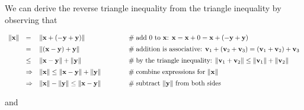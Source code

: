 \documentclass{article}
\theoremstyle{definition}
\begin{document}
\bigskip
\noindent 
We can derive the reverse triangle inequality from the
triangle inequality
\cite{vector_norms_and_matrix_norms,wiki:triangle_inequality} by
observing that

\begin{equation*}
\begin{array}{lllll}
\| \mathbf{x} \|
&=& \| \mathbf{x} + (-\mathbf{y} + \mathbf{y})\| 
					&\hspace{1.1cm} \mathrel{\#} \text{add 0 to $\mathbf{x}$: }
					\mathbf{x} =  \mathbf{x} + 0 
					= \mathbf{x} + (-\mathbf{y} + \mathbf{y}) \\
[5pt]
&=& \| (\mathbf{x} - \mathbf{y} ) + \mathbf{y} \|
					&\hspace{1.1cm} \mathrel{\#} \text{addition is associative: 
					$\mathbf{v}_1 + (\mathbf{v}_2 + \mathbf{v}_3) 
					= (\mathbf{v}_1 + \mathbf{v}_2) + \mathbf{v}_3$} \\
[5pt]
&\leq& \| \mathbf{x} - \mathbf{y} \| + \| \mathbf{y} \| 
					&\hspace{1.1cm} \mathrel{\#} \text{by the triangle inequality:
					$\| \mathbf{v}_1 + \mathbf{v}_2 \| \leq \| \mathbf{v}_1 \| + \| \mathbf{v}_2 \|$} \\
[5pt]
&\Rightarrow& \| \mathbf{x} \| \leq \| \mathbf{x} - \mathbf{y} \| + \| \mathbf{y} \|
					&\hspace{1.1cm} \mathrel{\#} \text{combine expressions for $\| \mathbf{x} \|$} \\
[5pt]
&\Rightarrow& \| \mathbf{x} \| - \| \mathbf{y} \| \leq \| \mathbf{x} - \mathbf{y} \| 
					&\hspace{1.1cm} \mathrel{\#} \text{subtract $\| \mathbf{y} \|$ from both sides}
\end{array}
\end{equation*}

\smallskip
\noindent
and
\end{document}
